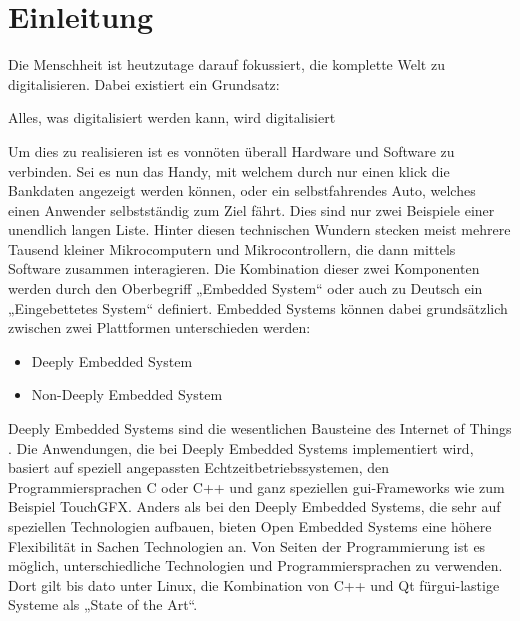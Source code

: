\chapter{Einleitung}
\label{chap:einleitung}
Die Menschheit ist heutzutage darauf fokussiert, die komplette Welt zu digitalisieren. Dabei
existiert ein Grundsatz:
\begin{zitat}
    Alles, was digitalisiert werden kann, wird digitalisiert \cite{digitalisierteWelt}
\end{zitat}

Um dies zu realisieren ist es vonnöten überall Hardware und Software zu verbinden. Sei es nun das
Handy, mit welchem durch nur einen klick die Bankdaten angezeigt werden können, oder ein
selbstfahrendes Auto, welches einen Anwender selbstständig zum Ziel fährt. Dies sind nur zwei
Beispiele einer unendlich langen Liste. Hinter diesen technischen Wundern stecken meist
mehrere Tausend kleiner Mikrocomputern und Mikrocontrollern, die dann mittels Software zusammen
interagieren. Die Kombination dieser zwei Komponenten werden durch den Oberbegriff „Embedded
System“ oder auch zu Deutsch ein „Eingebettetes System“ definiert.
\newline
\newline
Embedded Systems können dabei grundsätzlich zwischen zwei Plattformen unterschieden werden:
\begin{itemize}
    \item Deeply Embedded System
    \item Non-Deeply Embedded System
\end{itemize}
\newline
\newline
Deeply Embedded Systems sind die wesentlichen Bausteine des Internet of Things
\cite{HochschuleniederrheimDeeply}. Die Anwendungen,
die bei Deeply Embedded Systems implementiert wird, basiert auf speziell angepassten
Echtzeitbetriebssystemen, den Programmiersprachen C oder C++ und ganz speziellen
\ac{gui}-Frameworks wie zum Beispiel TouchGFX.
\newline
\newline
Anders als bei den Deeply Embedded Systems, die sehr auf speziellen Technologien aufbauen, bieten
Open Embedded Systems eine höhere Flexibilität in Sachen Technologien an. Von Seiten der
Programmierung ist es möglich, unterschiedliche Technologien und Programmiersprachen zu verwenden.
Dort gilt bis dato unter Linux, die Kombination von C++ und Qt für\ac{gui}-lastige Systeme als
„State of the Art“.
\newline
